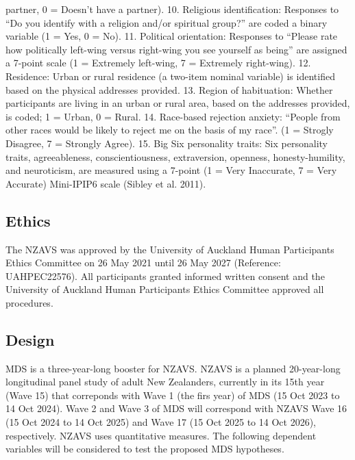 \documentclass[
]{interact}
\begin{document}
partner, 0 = Doesn't have a partner). 10. Religious identification:
Responses to ``Do you identify with a religion and/or spiritual group?''
are coded a binary variable (1 = Yes, 0 = No). 11. Political
orientation: Responses to ``Please rate how politically left-wing versus
right-wing you see yourself as being'' are assigned a 7-point scale (1 =
Extremely left-wing, 7 = Extremely right-wing). 12. Residence: Urban or
rural residence (a two-item nominal variable) is identified based on the
physical addresses provided. 13. Region of habituation: Whether
participants are living in an urban or rural area, based on the
addresses provided, is coded; 1 = Urban, 0 = Rural. 14. Race-based
rejection anxiety: ``People from other races would be likely to reject
me on the basis of my race''. (1 = Strogly Disagree, 7 = Strongly
Agree). 15. Big Six personality traits: Six personality traits,
agreeableness, conscientiousness, extraversion, openness,
honesty-humility, and neuroticism, are measured using a 7-point (1 =
Very Inaccurate, 7 = Very Accurate) Mini-IPIP6 scale (Sibley et al.
2011).

\subsection{Ethics}\label{ethics}

The NZAVS was approved by the University of Auckland Human Participants
Ethics Committee on 26 May 2021 until 26 May 2027 (Reference:
UAHPEC22576). All participants granted informed written consent and the
University of Auckland Human Participants Ethics Committee approved all
procedures.

\subsection{Design}\label{design}

MDS is a three-year-long booster for NZAVS. NZAVS is a planned
20-year-long longitudinal panel study of adult New Zealanders, currently
in its 15th year (Wave 15) that correponds with Wave 1 (the firs year)
of MDS (15 Oct 2023 to 14 Oct 2024). Wave 2 and Wave 3 of MDS will
correspond with NZAVS Wave 16 (15 Oct 2024 to 14 Oct 2025) and Wave 17
(15 Oct 2025 to 14 Oct 2026), respectively. NZAVS uses quantitative
measures. The following dependent variables will be considered to test
the proposed MDS hypotheses.
\end{document}
